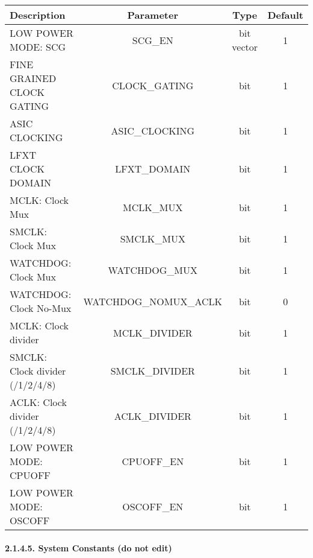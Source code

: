 \documentclass[]{article}
\let\oldparagraph\paragraph
\renewcommand{\paragraph}[1]{\oldparagraph{#1}\mbox{}}
\begin{document}
\begin{longtable}[]{@{}lccc@{}}
\toprule
Description & Parameter & Type & Default\tabularnewline
\midrule
\endhead
LOW POWER MODE: SCG & SCG\_EN & bit vector & 1\tabularnewline
FINE GRAINED CLOCK GATING & CLOCK\_GATING & bit & 1\tabularnewline
ASIC CLOCKING & ASIC\_CLOCKING & bit & 1\tabularnewline
LFXT CLOCK DOMAIN & LFXT\_DOMAIN & bit & 1\tabularnewline
MCLK: Clock Mux & MCLK\_MUX & bit & 1\tabularnewline
SMCLK: Clock Mux & SMCLK\_MUX & bit & 1\tabularnewline
WATCHDOG: Clock Mux & WATCHDOG\_MUX & bit & 1\tabularnewline
WATCHDOG: Clock No-Mux & WATCHDOG\_NOMUX\_ACLK & bit & 0\tabularnewline
MCLK: Clock divider & MCLK\_DIVIDER & bit & 1\tabularnewline
SMCLK: Clock divider (/1/2/4/8) & SMCLK\_DIVIDER & bit &
1\tabularnewline
ACLK: Clock divider (/1/2/4/8) & ACLK\_DIVIDER & bit & 1\tabularnewline
LOW POWER MODE: CPUOFF & CPUOFF\_EN & bit & 1\tabularnewline
LOW POWER MODE: OSCOFF & OSCOFF\_EN & bit & 1\tabularnewline
\bottomrule
\end{longtable}

\hypertarget{system-constants-do-not-edit}{%
\paragraph{2.1.4.5. System Constants (do not
edit)}\label{system-constants-do-not-edit}}
\end{document}
